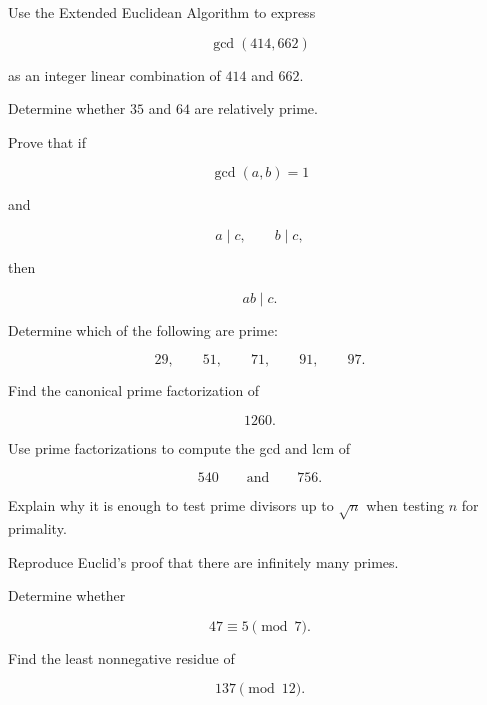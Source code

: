 \begin{exercise}[3]
Use the Extended Euclidean Algorithm to express

\[ \gcd(414,662) \]

as an integer linear combination of \(414\) and \(662\).
\end{exercise}

\begin{exercise}[2]
Determine whether \(35\) and \(64\) are relatively prime.
\end{exercise}

\begin{exercise}[2]
Prove that if

\[ \gcd(a,b)=1 \]

and

\[ a\mid c,\qquad b\mid c, \]

then

\[ ab\mid c. \]
\end{exercise}

\begin{exercise}[1]
Determine which of the following are prime:

\[ 29,\qquad51,\qquad71,\qquad91,\qquad97. \]
\end{exercise}

\begin{exercise}[1]
Find the canonical prime factorization of

\[ 1260. \]
\end{exercise}

\begin{exercise}[2]
Use prime factorizations to compute the gcd and lcm of

\[ 540\qquad\text{and}\qquad756. \]
\end{exercise}

\begin{exercise}[2]
Explain why it is enough to test prime divisors up to \(\sqrt n\) when
testing \(n\) for primality.
\end{exercise}

\begin{exercise}[2]
Reproduce Euclid's proof that there are infinitely many primes.
\end{exercise}

\begin{exercise}[1]
Determine whether

\[ 47\equiv5\pmod7. \]
\end{exercise}

\begin{exercise}[1]
Find the least nonnegative residue of

\[ 137\pmod{12}. \]
\end{exercise}

